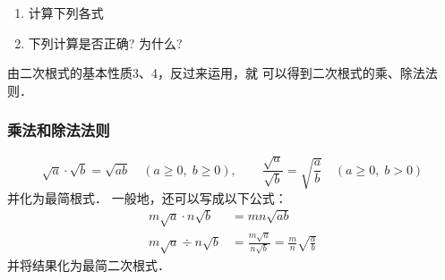 \begin{ex}
\begin{enumerate}
    \item 计算下列各式
\begin{enumerate}
\end{enumerate}

\item 下列计算是否正确? 为什么?
\begin{enumerate}
\end{enumerate}
\end{enumerate}
\end{ex}

由二次根式的基本性质3、4，反过来运用，就
可以得到二次根式的乘、除法法则．

\subsubsection{乘法和除法法则}
\[\sqrt{a}\cdot \sqrt{b}=\sqrt{ab}\quad (a\ge 0,\; b\ge 0),\qquad \frac{\sqrt{a}}{\sqrt{b}}=\sqrt{\frac{a}{b}}\quad (a\ge 0,\; b>0)  \]
并化为最简根式．
一般地，还可以写成以下公式：
\[\begin{split}
    m\sqrt{a}\cdot n\sqrt{b}&= mn\sqrt{ab}\\
    m\sqrt{a}\div n\sqrt{b}&=\frac{m\sqrt{a}}{n\sqrt{b}}=\frac{m}{n}\sqrt{\frac{a}{b}}
\end{split}\]
并将结果化为最简二次根式．

